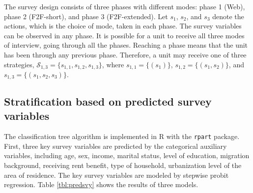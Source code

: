 \documentclass[11pt]{article}
\begin{document}
The survey design consists of three phases with different modes: phase 1 (Web), phase 2 (F2F-short), and phase 3 (F2F-extended). Let $s_1$, $s_2$, and $s_3$ denote the actions, which is the choice of mode, taken in each phase. The survey variables can be observed in any phase. It is possible for a unit to receive all three modes of interview, going through all the phases. Reaching a phase means that the unit has been through any previous phase. Therefore, a unit may receive one of three strategies, $\mathcal{S}_{1,3}=\{s_{1,1}, s_{1,2}, s_{1,3}\}$, where $s_{1,1}=\{(s_1)\}$, $s_{1,2}=\{(s_1, s_2)\}$, and $s_{1,3}=\{(s_1, s_2, s_3)\}$.

\subsection{Stratification based on predicted survey variables}
\label{sec:strata}

The classification tree algorithm is implemented in \textsf{R} with the \texttt{rpart} package. First, three key survey variables are predicted by the categorical auxiliary variables, including age, sex, income, marital status, level of education, migration background, receiving rent benefit, type of household, urbanization level of the area of residence. The key survey variables are modeled by stepwise probit regression. Table \ref{tbl:predsvy} shows the results of three models.
\end{document}
